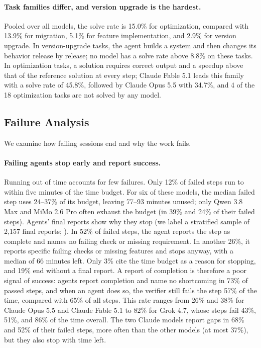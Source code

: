 \documentclass{article}
\begin{document}
\paragraph{Task families differ, and version upgrade is the hardest.}
Pooled over all models, the solve rate is 15.0\% for optimization, compared
with 13.9\% for migration, 5.1\% for feature implementation, and 2.9\% for
version upgrade. In version-upgrade tasks, the agent builds a system and then
changes its behavior release by release; no model has a solve rate above 8.8\%
on these tasks. In optimization tasks, a solution requires correct output and a
speedup above that of the reference solution at every step; Claude Fable 5.1
leads this family with a solve rate of 45.8\%, followed by Claude Opus 5.5 with
34.7\%, and 4 of the 18 optimization tasks are not solved by any model.

\subsection{Failure Analysis}
\label{sec:result-analysis}

We examine how failing sessions end and why the work fails.

\paragraph{Failing agents stop early and report success.}
Running out of time accounts for few failures. Only 12\% of failed steps run to within
five minutes of the time budget. For six of these models, the median failed
step uses 24--37\% of its budget, leaving 77--93 minutes unused; only Qwen 3.8
Max and MiMo 2.6 Pro often exhaust the budget (in 39\% and 24\% of their failed
steps). Agents' final reports show why they stop (we label a stratified sample
of 2,157 final reports; ). In 52\% of
failed steps, the agent reports the step as complete and names no failing check or missing
requirement. In another 26\%, it reports specific failing checks or missing
features and stops anyway, with a median of 66 minutes left. Only 3\% cite the
time budget as a reason for stopping, and 19\% end without a final report. A report of completion is therefore a
poor signal of success: agents report completion and name no shortcoming in 73\% of
passed steps, and when an agent does so, the verifier still fails the step 57\% of
the time, compared with 65\% of all steps. This rate ranges from 26\% and 38\% for
Claude Opus 5.5 and Claude Fable 5.1 to 82\% for Grok 4.7, whose steps fail 43\%,
51\%, and 86\% of the time overall. The two Claude models report gaps in 68\% and 52\% of their failed
steps, more often than the other models (at most 37\%), but they also stop with
time left.
\end{document}
